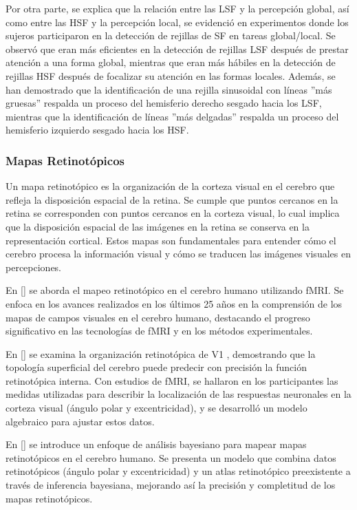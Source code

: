 Por otra parte, se explica que la relación entre las LSF y la percepción global, así como entre las HSF y la percepción local, se evidenció en experimentos donde los sujeros participaron en la detección de rejillas de SF en tareas global/local. Se observó que eran más eficientes en la detección de rejillas LSF después de prestar atención a una forma global, mientras que eran más hábiles en la detección de rejillas HSF después de focalizar su atención en las formas locales. Además, se han demostrado que la identificación de una rejilla sinusoidal con líneas ''más gruesas'' respalda un proceso del hemisferio derecho sesgado hacia los LSF, mientras que la identificación de líneas ''más delgadas'' respalda un proceso del hemisferio izquierdo sesgado hacia los HSF. 



\subsubsection*{Mapas Retinot\'opicos}
Un mapa retinotópico es la organización de la corteza visual en el cerebro que refleja la disposición espacial de la retina. Se cumple que puntos cercanos en la retina se corresponden con puntos cercanos en la corteza visual, lo cual implica que la disposición espacial de las imágenes en la retina se conserva en la representación cortical. Estos mapas son fundamentales para entender cómo el cerebro procesa la información visual y cómo se traducen las imágenes visuales en percepciones.

En [\cite{wandell_imaging_2011}] se aborda el mapeo retinotópico en el cerebro humano utilizando fMRI. Se enfoca en los avances realizados en los últimos 25 años en la comprensión de los mapas de campos visuales en el cerebro humano, destacando el progreso significativo en las tecnologías de fMRI y en los métodos experimentales.

En [\cite{benson_retinotopic_2012}] se examina la organización retinotópica de V1 , demostrando que la topología superficial del cerebro puede predecir con precisión la función retinotópica interna. Con estudios de fMRI, se hallaron en los participantes las medidas utilizadas para describir la localización de las respuestas neuronales en la corteza visual (ángulo polar y excentricidad), y se desarroll\'o un modelo algebraico para ajustar estos datos. 

En [\cite{benson_bayesian_2018}] se introduce un enfoque de análisis bayesiano para mapear mapas retinotópicos en el cerebro humano. Se presenta un modelo que combina datos retinotópicos (ángulo polar y excentricidad) y un atlas retinotópico preexistente a través de inferencia bayesiana, mejorando así la precisión y completitud de los mapas retinotópicos. 


